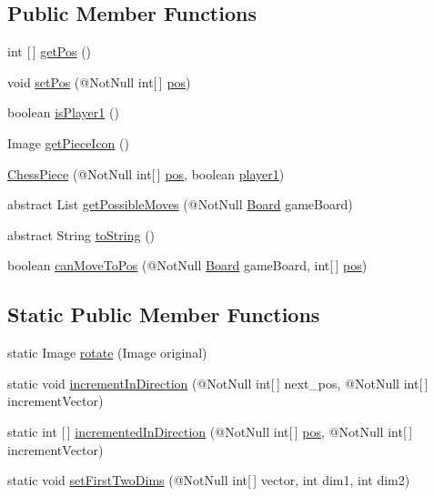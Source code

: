\subsection*{Public Member Functions}
\begin{DoxyCompactItemize}
\item 
int \mbox{[}$\,$\mbox{]} \mbox{\hyperlink{class_chess_piece_a1d244aeaf799afb923173d055fb5bb6b}{get\+Pos}} ()
\item 
void \mbox{\hyperlink{class_chess_piece_a015ef81cf82ce3365b068917e4cc459b}{set\+Pos}} (@Not\+Null int\mbox{[}$\,$\mbox{]} \mbox{\hyperlink{class_chess_piece_ae9f0da2b5fca2557eab359044a7ba1ac}{pos}})
\item 
boolean \mbox{\hyperlink{class_chess_piece_aaa1739b07a9669275d38dab803d1c68f}{is\+Player1}} ()
\item 
Image \mbox{\hyperlink{class_chess_piece_a13507c93ebbf4808935a49a9a102323b}{get\+Piece\+Icon}} ()
\item 
\mbox{\hyperlink{class_chess_piece_abe5af350343324a1cc0f81db96707249}{Chess\+Piece}} (@Not\+Null int\mbox{[}$\,$\mbox{]} \mbox{\hyperlink{class_chess_piece_ae9f0da2b5fca2557eab359044a7ba1ac}{pos}}, boolean \mbox{\hyperlink{class_chess_piece_aa8711ff5ce8a45159b9b30c8148a34b2}{player1}})
\item 
abstract List \mbox{\hyperlink{class_chess_piece_ae8ea6bb48b9892a4f907804586ed9786}{get\+Possible\+Moves}} (@Not\+Null \mbox{\hyperlink{class_board}{Board}} game\+Board)
\item 
abstract String \mbox{\hyperlink{class_chess_piece_a01d080bacbdea6f521e3ff13d56c0787}{to\+String}} ()
\item 
boolean \mbox{\hyperlink{class_chess_piece_a927daa9d5c14a1215d5869e598ebdafe}{can\+Move\+To\+Pos}} (@Not\+Null \mbox{\hyperlink{class_board}{Board}} game\+Board, int\mbox{[}$\,$\mbox{]} \mbox{\hyperlink{class_chess_piece_ae9f0da2b5fca2557eab359044a7ba1ac}{pos}})
\end{DoxyCompactItemize}
\subsection*{Static Public Member Functions}
\begin{DoxyCompactItemize}
\item 
static Image \mbox{\hyperlink{class_chess_piece_a25311d1cc6336c7d22d72efa70c19544}{rotate}} (Image original)
\item 
static void \mbox{\hyperlink{class_chess_piece_afc4c8e0066a968f0156857f0e8003a10}{increment\+In\+Direction}} (@Not\+Null int\mbox{[}$\,$\mbox{]} next\+\_\+pos, @Not\+Null int\mbox{[}$\,$\mbox{]} increment\+Vector)
\item 
static int \mbox{[}$\,$\mbox{]} \mbox{\hyperlink{class_chess_piece_aea17bf7ab9ffbb479975f5bedb66e359}{incremented\+In\+Direction}} (@Not\+Null int\mbox{[}$\,$\mbox{]} \mbox{\hyperlink{class_chess_piece_ae9f0da2b5fca2557eab359044a7ba1ac}{pos}}, @Not\+Null int\mbox{[}$\,$\mbox{]} increment\+Vector)
\item 
static void \mbox{\hyperlink{class_chess_piece_abe0c0ec5206ebf3661f1acec163c447c}{set\+First\+Two\+Dims}} (@Not\+Null int\mbox{[}$\,$\mbox{]} vector, int dim1, int dim2)
\end{DoxyCompactItemize}
